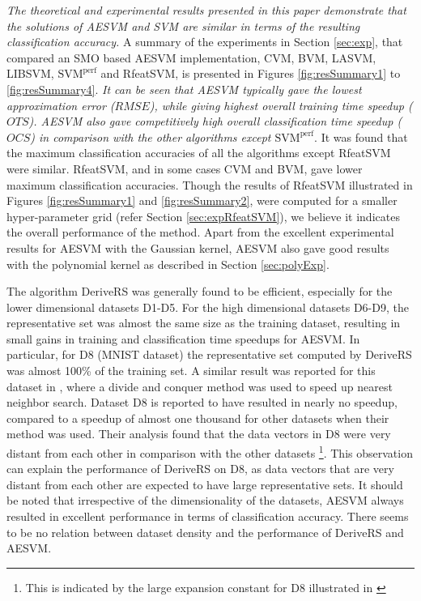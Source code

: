 \documentclass[twoside]{article}
\begin{document}
\emph{The theoretical and experimental results presented in this paper demonstrate that the solutions of AESVM and SVM are similar in terms of the resulting classification accuracy.} A summary of the experiments in Section \ref{sec:exp}, that compared an SMO based AESVM implementation, CVM, BVM, LASVM, LIBSVM, $\text{SVM}^{\text{perf}}$ and RfeatSVM, is presented in Figures \ref{fig:resSummary1} to \ref{fig:resSummary4}. \emph{It can be seen that AESVM typically gave the lowest approximation error ($RMSE$), while giving highest overall training time speedup ($OTS$). AESVM also gave competitively high overall classification time speedup ($OCS$) in comparison with the other algorithms except $\text{SVM}^{\text{perf}}$}. It was found that the maximum classification accuracies of all the algorithms except RfeatSVM were similar. RfeatSVM, and in some cases CVM and BVM, gave lower maximum classification accuracies. Though the results of RfeatSVM illustrated in Figures \ref{fig:resSummary1} and \ref{fig:resSummary2}, were computed for a smaller hyper-parameter grid (refer Section \ref{sec:expRfeatSVM}), we believe it indicates the overall performance of the method. Apart from the excellent experimental results for AESVM with the Gaussian kernel, AESVM also gave good results with the polynomial kernel as described in Section \ref{sec:polyExp}.

The algorithm DeriveRS was generally found to be efficient, especially for the lower dimensional datasets D1-D5. For the high dimensional datasets D6-D9, the representative set was almost the same size as the training dataset, resulting in small gains in training and classification time speedups for AESVM. In particular, for D8 (MNIST dataset) the representative set computed by DeriveRS was almost 100\% of the training set. A similar result was reported for this dataset in \citet{Beygelzimer06}, where a divide and conquer method was used to speed up nearest neighbor search. Dataset D8 is reported to have resulted in nearly no speedup, compared to a speedup of almost one thousand for other datasets when their method was used. Their analysis found that the data vectors in D8 were very distant from each other in comparison with the other datasets \footnote{This is indicated by the large expansion constant for D8 illustrated in \citet{Beygelzimer06}}. This observation can explain the performance of DeriveRS on D8, as data vectors that are very distant from each other are expected to have large representative sets. It should be noted that irrespective of the dimensionality of the datasets, AESVM always resulted in excellent performance in terms of classification accuracy. There seems to be no relation between dataset density and the performance of DeriveRS and AESVM.
\end{document}
